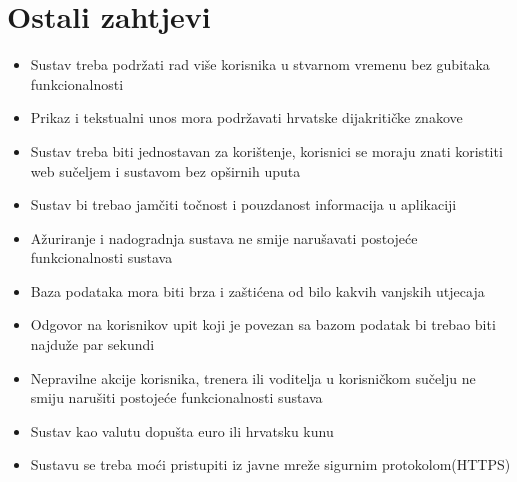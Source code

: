 				
				
				\eject
	            
	            
	            
		\section{Ostali zahtjevi}
		
			\begin{itemize}
	        	\item 	Sustav treba podržati rad više korisnika u stvarnom vremenu bez gubitaka funkcionalnosti
	        	\item 	Prikaz i tekstualni unos mora podržavati hrvatske dijakritičke znakove
	        	\item 	Sustav treba biti jednostavan za korištenje, korisnici se moraju znati koristiti web sučeljem i sustavom bez opširnih uputa 
	        	\item 	Sustav bi trebao jamčiti točnost i pouzdanost informacija u aplikaciji
	        	\item 	Ažuriranje i nadogradnja sustava ne smije narušavati postojeće funkcionalnosti sustava
	        	\item 	Baza podataka mora biti brza i zaštićena od bilo kakvih vanjskih utjecaja
	        	\item 	Odgovor na korisnikov upit koji je povezan sa bazom podatak bi trebao biti najduže par sekundi
	        	\item 	Nepravilne akcije korisnika, trenera ili voditelja u korisničkom sučelju ne smiju narušiti postojeće funkcionalnosti sustava
	        	\item 	Sustav kao valutu dopušta euro ili hrvatsku kunu
	        	\item 	Sustavu se treba moći pristupiti iz javne mreže sigurnim protokolom(HTTPS)
        	\end{itemize}
			 
			 
			 
	